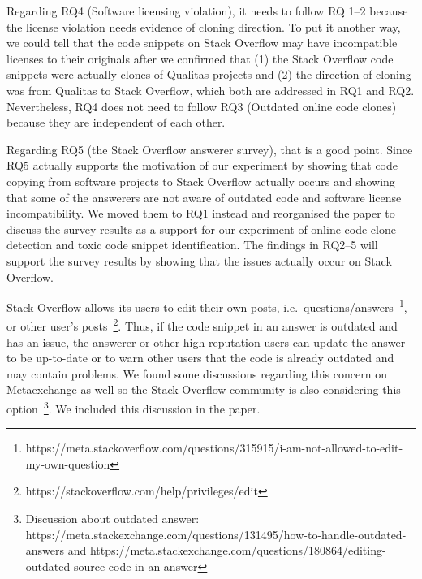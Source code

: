 \documentclass[a4paper,twoside,10pt]{reviewresponse}
\begin{document}
Regarding RQ4 (Software licensing violation), it needs to follow RQ 1--2 because the license violation needs evidence of cloning direction. To put it another way, we could tell that the code snippets on Stack Overflow may have incompatible licenses to their originals after we confirmed that (1) the Stack Overflow code snippets were actually clones of Qualitas projects and (2) the direction of cloning was from Qualitas to Stack Overflow, which both are addressed in RQ1 and RQ2.
Nevertheless, RQ4 does not need to follow RQ3 (Outdated online code clones) because they are independent of each other.

Regarding RQ5 (the Stack Overflow answerer survey), that is a good point. Since RQ5 actually supports the motivation of our experiment by showing that code copying from software projects to Stack Overflow actually occurs and showing that some of the answerers are not aware of outdated code and software license incompatibility. We moved them to RQ1 instead and reorganised the paper to discuss the survey results as a support for our experiment of online code clone detection and toxic code snippet identification. The findings in RQ2--5 will support the survey results by showing that the issues actually occur on Stack Overflow.


Stack Overflow allows its users to edit their own posts, i.e.~questions/answers~\footnote{https://meta.stackoverflow.com/questions/315915/i-am-not-allowed-to-edit-my-own-question}, or other user's posts~\footnote{https://stackoverflow.com/help/privileges/edit}. Thus, if the code snippet in an answer is outdated and has an issue, the answerer or other high-reputation users can update the answer to be up-to-date or to warn other users that the code is already outdated and may contain problems. We found some discussions regarding this concern on Metaexchange as well so the Stack Overflow community is also considering this option~\footnote{Discussion about outdated answer: https://meta.stackexchange.com/questions/131495/how-to-handle-outdated-answers and https://meta.stackexchange.com/questions/180864/editing-outdated-source-code-in-an-answer}. We included this discussion in the paper.
\end{document}
